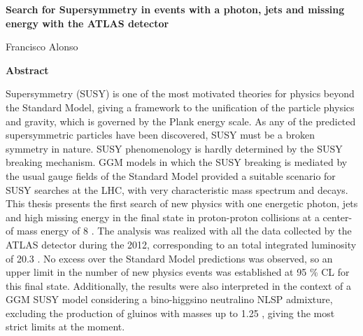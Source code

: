\thispagestyle{plain}
\begin{center}
  \Large
  \textbf{Search for Supersymmetry in events with a photon, jets and
    missing energy with the ATLAS detector}

  \vspace{0.4cm}
  \large

  \vspace{0.4cm}
  Francisco Alonso

  \vspace{2cm}
  \textbf{Abstract}
\end{center}

Supersymmetry (SUSY) is one of the most motivated theories for physics beyond
the Standard Model, giving a framework to the unification of the particle
physics and gravity, which is governed by the Plank energy scale. As any of
the predicted supersymmetric particles have been discovered, SUSY must be a
broken symmetry in nature. SUSY phenomenology is hardly determined by the SUSY
breaking mechanism. GGM models in which the SUSY breaking is mediated by the
usual gauge fields of the Standard Model provided a suitable scenario for SUSY
searches at the LHC, with very characteristic mass spectrum and decays. This
thesis presents the first search of new physics with one energetic photon, jets
and high missing energy in the final state in proton-proton collisions at a
center-of mass energy of 8 {\tev}. The analysis was realized with all the data
collected by the ATLAS detector during the 2012, corresponding to an total
integrated luminosity of 20.3 \ifb. No excess over the Standard Model
predictions was observed, so an upper limit in the number of new physics events
was established at 95 \% CL for this final state. Additionally, the results were
also interpreted in the context of a GGM SUSY model considering a bino-higgsino
neutralino NLSP admixture, excluding the production of gluinos with masses up to
1.25 \tev, giving the most strict limits at the moment.

